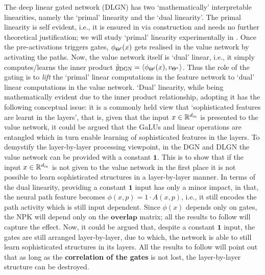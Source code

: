 The deep linear gated network (DLGN) has two `mathematically' interpretable linearities, namely the `primal' linearity and the `dual linearity'. The primal linearity is self evident, i.e., it is ensured in via construction and needs no further theoretical justification; we will  study  `primal' linearity experimentally in . Once the pre-activations triggers gates, $\phi_{\Theta^{\textrm{f}}}(x)$ gets realised in the value network by activating the paths.  Now, the value network itself is `dual' linear, i.e., it simply computes/learns the inner product $\hat{y}_{\text{DGN}}=\langle \phi_{\Theta^{\textrm{f}}}(x),v_{{\Theta}^{\text{v}}}\rangle$. Thus the role of the gating is to \emph{lift} the `primal' linear computations in the feature network to `dual' linear computations in the value network. `Dual' linearity, while being mathematically evident due to the inner product relationship, adopting it has the following conceptual issue: it is a commonly held view that `sophisticated features are learnt in the layers', that is, given that the input $x\in\mathbb{R}^{d_{\text{in}}}$  is presented to the value network, it could be argued that the GaLUs and linear operations are entangled which in turn enable learning of sophisticated features in the layers. To demystify the layer-by-layer processing viewpoint, in the DGN and DLGN the value network can be provided with a constant $\mathbf{1}$. This is to show that if the input $x\in\mathbb{R}^{d_{\text{in}}}$ is not given to the value network in the first place it is not possible to learn sophisticated structures in a layer-by-layer manner.  In terms of the dual linearity, providing a constant $\mathbf{1}$ input has only a minor impact, in that, the neural path feature becomes $\phi(x,p)=1\cdot A(x,p)$, i.e., it still encodes the path activity which is still input dependent. Since $\phi(x)$ depends only on gates, the NPK will depend only on the $\textbf{overlap}$ matrix; all the results to follow will capture the effect. Now, it could be argued that, despite a constant $\mathbf{1}$ input, the gates are still arranged layer-by-layer, due to which, the network is able to still learn sophisticated structures in its layers. All the results to follow will point out that as long as the \textbf{correlation of the gates} is not lost, the layer-by-layer structure can be destroyed.
% 
